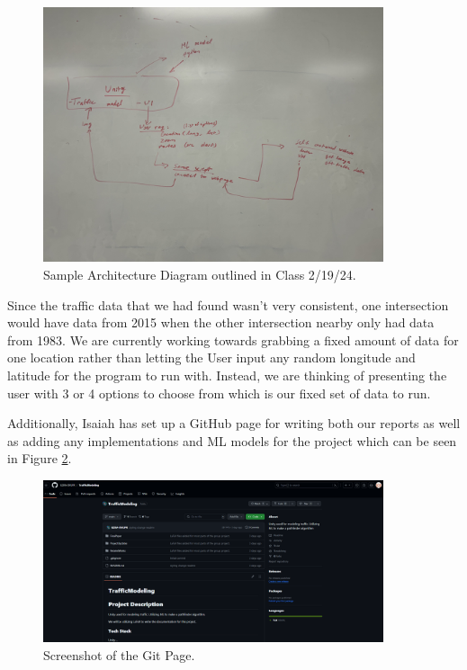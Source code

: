 \begin{figure}[htb]
    \centering
    \includegraphics[width=10cm]{../Images/ArchitectureDiagram.jpg}
       \caption{Sample Architecture Diagram outlined in Class 2/19/24.}
           \label{Fig:ArchitectureDiagram}
  \end{figure}


\begin{flushleft}
Since the traffic data that we had found wasn't very consistent, one intersection would have data from 2015 when the other intersection nearby only had data from 1983.
We are currently working towards grabbing a fixed amount of data for one location rather than letting the User input any random longitude and latitude for the program to run with. 
Instead, we are thinking of presenting the user with 3 or 4 options to choose from which is our fixed set of data to run. \par

Additionally, Isaiah has set up a GitHub page for writing both our reports as well as adding any implementations and ML models for the project which can be seen in Figure \ref{Fig:GitPage}.
\end{flushleft}


\begin{figure}[htb]
    \centering
    \includegraphics[width=10cm]{../Images/GitPage.png}
       \caption{Screenshot of the Git Page.}
           \label{Fig:GitPage}
\end{figure}

\newpage